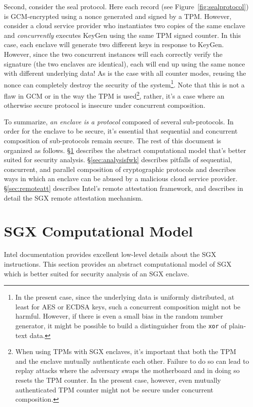 \documentclass[10pt, letterpaper]{article}
\newcommand{\secref}[1]{\S\ref{#1}}
\begin{document}
  Second, consider the seal protocol. Here each record (see
  Figure~\ref{fig:sealprotocol}) is GCM-encrypted using a nonce
  generated and signed by a TPM. However, consider a cloud service
  provider who instantiates two copies of the same enclave and
  \textit{concurrently} executes \textsf{KeyGen} using the same TPM
  signed counter. In this case, each enclave will generate two
  different keys in response to \textsf{KeyGen}. However, since the
  two concurrent instances will each correctly verify the signature
  (the two enclaves are identical), each will end up using the same
  nonce with different underlying data! As is the case with all
  counter modes, reusing the nonce can completely destroy the security
  of the system\footnote{In the present case, since the underlying
    data is uniformly distributed, at least for AES or ECDSA keys,
    such a concurrent composition might not be harmful. However, if
    there is even a small bias in the random number generator, it
    might be possible to build a distinguisher from the \texttt{xor}
    of plain-text data.}. Note that this is not a flaw in GCM or in
  the way the TPM is used\footnote{When using TPMs with SGX enclaves,
    it's important that both the TPM and the enclave mutually
    authenticate each other. Failure to do so can lead to replay
    attacks where the adversary swaps the motherboard and in doing so
    resets the TPM counter. In the present case, however, even
    mutually authenticated TPM counter might not be secure under
    concurrent composition.}, rather, it's a case where an otherwise
  secure protocol is insecure under concurrent composition.

  To summarize, \textit{an enclave is a protocol} composed of several
  sub-protocols. In order for the enclave to be secure, it's essential
  that sequential and concurrent composition of sub-protocols remain
  secure. The rest of this document is organized as follows.
  \secref{sec:model} describes the abstract computational model that's
  better suited for security analysis. \secref{sec:analysisfwk}
  describes pitfalls of sequential, concurrent, and parallel
  composition of cryptographic protocols and describes ways in which
  an enclave can be abused by a malicious cloud service
  provider. \secref{sec:remoteatt} describes Intel's remote attestation
  framework, and describes in detail the SGX remote attestation
  mechanism.

  \section{SGX Computational Model}
  \label{sec:model}
  Intel documentation\cite{intelsdm} provides excellent low-level
  details about the SGX instructions. This section provides an
  abstract computational model of SGX which is better suited for
  security analysis of an SGX enclave.
\end{document}
